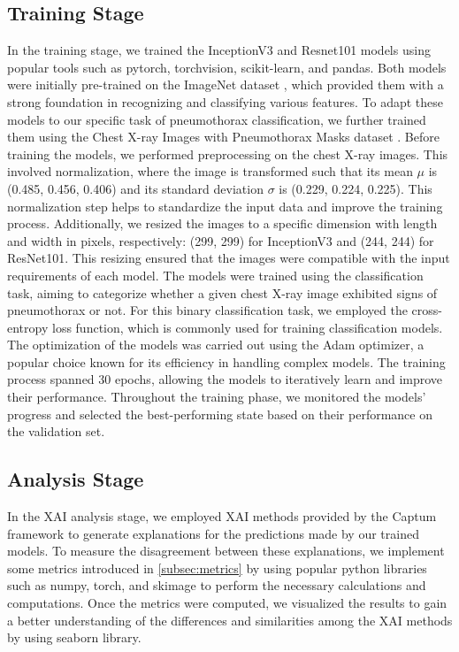\subsection{Training Stage}
In the training stage, we trained the InceptionV3 \cite{inceptionv3} and Resnet101 \cite{resnet101} models using popular tools such as pytorch, torchvision, scikit-learn, and pandas. Both models were initially pre-trained on the ImageNet dataset \cite{imageNet}, which provided them with a strong foundation in recognizing and classifying various features. To adapt these models to our specific task of pneumothorax classification, we further trained them using the Chest X-ray Images with Pneumothorax Masks dataset \cite{pneumothorax}. Before training the models, we performed preprocessing on the chest X-ray images. This involved normalization, where the image is transformed such that its mean $\mu$ is (0.485, 0.456, 0.406) and its standard deviation $\sigma$ is (0.229, 0.224, 0.225). This normalization step helps to standardize the input data and improve the training process. Additionally, we resized the images to a specific dimension with length and width in pixels, respectively: (299, 299) for InceptionV3 and (244, 244) for ResNet101. This resizing ensured that the images were compatible with the input requirements of each model. The models were trained using the classification task, aiming to categorize whether a given chest X-ray image exhibited signs of pneumothorax or not. For this binary classification task, we employed the cross-entropy loss function, which is commonly used for training classification models. The optimization of the models was carried out using the Adam optimizer, a popular choice known for its efficiency in handling complex models. The training process spanned 30 epochs, allowing the models to iteratively learn and improve their performance. Throughout the training phase, we monitored the models' progress and selected the best-performing state based on their performance on the validation set.

\subsection{Analysis Stage}
In the XAI analysis stage, we employed XAI methods provided by the Captum framework to generate explanations for the predictions made by our trained models. To measure the disagreement between these explanations, we implement some metrics introduced in \ref{subsec:metrics} by using popular python libraries such as numpy, torch, and skimage to perform the necessary calculations and computations. Once the metrics were computed, we visualized the results to gain a better understanding of the differences and similarities among the XAI methods by using seaborn library.